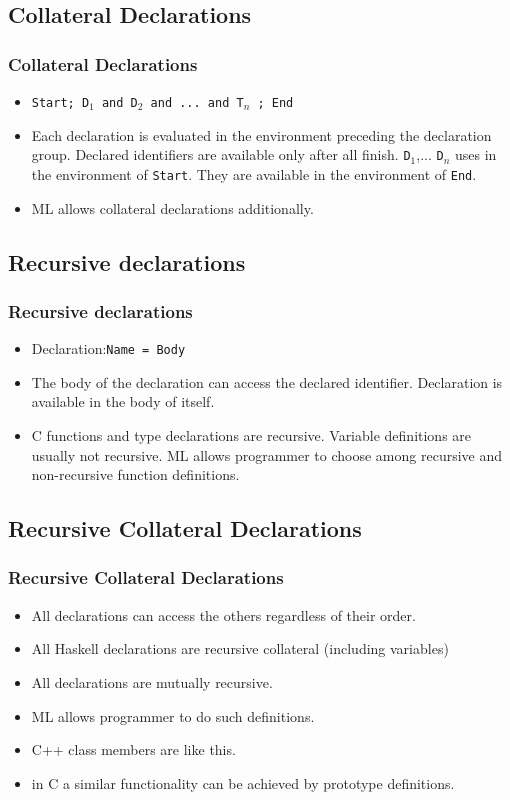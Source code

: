 \subsection{Collateral Declarations}
\begin{frame}
\frametitle{Collateral Declarations}
\begin{itemize}
 \item \texttt{Start; D$_1$ and D$_2$ and ...  and T$_n$ ; End}
 \item Each declaration is evaluated in the environment preceding the declaration group.
 Declared identifiers are available only after all finish.
\texttt{D$_1$},... \texttt{D$_n$} uses in the environment of \texttt{Start}. They are 
available in the environment of \texttt{End}.
 \item ML allows collateral declarations additionally.
\end{itemize}
\end{frame}

\subsection{Recursive declarations}
\begin{frame}
\frametitle{Recursive declarations}
\begin{itemize}
 \item Declaration:\texttt{Name = Body}
 \item The body of the declaration can access the declared identifier. Declaration is available
 in the body of itself.
 \item C functions and type declarations are recursive. Variable definitions are usually not
 recursive. ML allows programmer to choose among recursive and non-recursive
 function definitions.
\end{itemize}
\end{frame}

\subsection{Recursive Collateral Declarations}
\begin{frame}
\frametitle{Recursive Collateral Declarations}
\begin{itemize}
 \item All declarations can access the others regardless of their order.
 \item All Haskell declarations are recursive collateral (including variables)
 \item All declarations are mutually recursive.
 \item ML allows programmer to do such definitions.
 \item C++ class members are like this.
 \item in C a similar functionality can be achieved by prototype definitions.
\end{itemize}
\end{frame}

